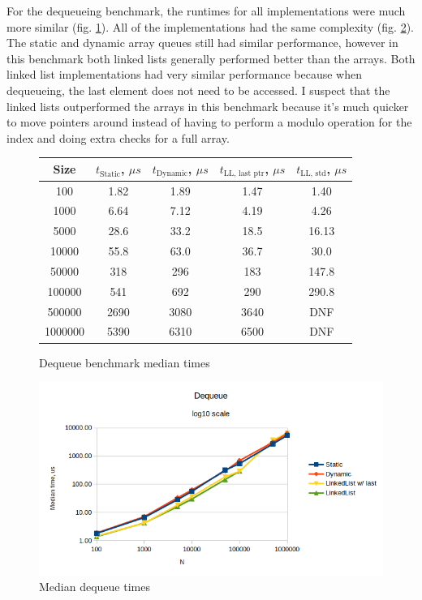 \documentclass[a4paper,11pt]{article}
\begin{document}
    For the dequeueing benchmark, the runtimes for all implementations were much more similar (fig. \ref{fig:d-table}). All of the implementations had the same complexity (fig. \ref{fig:d}). The static and dynamic array queues still had similar performance, however in this benchmark both linked lists generally performed better than the arrays. Both linked list implementations had very similar performance because when dequeueing, the last element does not need to be accessed. I suspect that the linked lists outperformed the arrays in this benchmark because it's much quicker to move pointers around instead of having to perform a modulo operation for the index and doing extra checks for a full array.

    \begin{figure}[H]
        \centering
        
        \begin{tabular}{c|c|c|c|c}
            Size & $t_\text{Static}$, $\mu s$ & $t_\text{Dynamic}$, $\mu s$ & $t_\text{LL, last ptr}$, $\mu s$ & $t_\text{LL, std}$, $\mu s$ \\
            \hline
            \hline
            100 & 1.82 & 1.89 & 1.47 & 1.40 \\
            \hline
            1000 & 6.64 & 7.12 & 4.19 & 4.26 \\
            \hline
            5000 & 28.6 & 33.2 & 18.5 & 16.13 \\
            \hline
            10000 & 55.8 & 63.0 & 36.7 & 30.0 \\
            \hline
            50000 & 318 & 296 & 183 & 147.8 \\
            \hline
            100000 & 541 & 692 & 290 & 290.8 \\
            \hline
            500000 & 2690 & 3080 & 3640 & DNF \\
            \hline
            1000000 & 5390 & 6310 & 6500 & DNF \\
        \end{tabular}

        \caption{Dequeue benchmark median times}
        \label{fig:d-table}
    \end{figure}

    \begin{figure}[H]
        \centering
        \includegraphics[width=\textwidth]{d.png}
        \caption{Median dequeue times}
        \label{fig:d}
    \end{figure}
\end{document}
